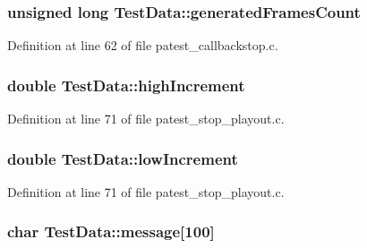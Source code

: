 \subsubsection[{\texorpdfstring{generated\+Frames\+Count}{generatedFramesCount}}]{\setlength{\rightskip}{0pt plus 5cm}unsigned long Test\+Data\+::generated\+Frames\+Count}\hypertarget{struct_test_data_a0cba315e16166503eba8d3906254de95}{}\label{struct_test_data_a0cba315e16166503eba8d3906254de95}


Definition at line 62 of file patest\+\_\+callbackstop.\+c.

\subsubsection[{\texorpdfstring{high\+Increment}{highIncrement}}]{\setlength{\rightskip}{0pt plus 5cm}double Test\+Data\+::high\+Increment}\hypertarget{struct_test_data_af315225298caa18b1a18cda784a6a4a3}{}\label{struct_test_data_af315225298caa18b1a18cda784a6a4a3}


Definition at line 71 of file patest\+\_\+stop\+\_\+playout.\+c.

\subsubsection[{\texorpdfstring{low\+Increment}{lowIncrement}}]{\setlength{\rightskip}{0pt plus 5cm}double Test\+Data\+::low\+Increment}\hypertarget{struct_test_data_ac60eaf6fc24ef246b450e292c4d54019}{}\label{struct_test_data_ac60eaf6fc24ef246b450e292c4d54019}


Definition at line 71 of file patest\+\_\+stop\+\_\+playout.\+c.

\subsubsection[{\texorpdfstring{message}{message}}]{\setlength{\rightskip}{0pt plus 5cm}char Test\+Data\+::message\mbox{[}100\mbox{]}}\hypertarget{struct_test_data_ab086bd8efe2e156d3bf6d2edcd20acfd}{}\label{struct_test_data_ab086bd8efe2e156d3bf6d2edcd20acfd}


